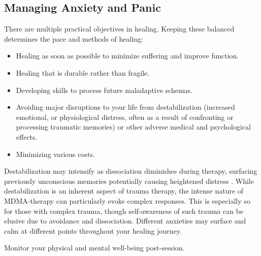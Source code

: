 \documentclass[12pt,letterpaper]{article}
\begin{document}
\subsection{Managing Anxiety and Panic}
\label{sectionManagement}
There are multiple practical objectives in healing. Keeping these balanced determines the pace and methods of healing:
\begin{itemize}
    \item Healing as soon as possible to minimize suffering and improve function.
    \item Healing that is durable rather than fragile.
    \item Developing skills to process future maladaptive schemas.
    \item Avoiding major disruptions to your life from destabilization (increased emotional, or physiological distress, often as a result of confronting or processing traumatic memories) or other adverse medical and psychological effects.
    \item Minimizing various costs.
\end{itemize}
Destabilization may intensify as dissociation diminishes during therapy, surfacing previously unconscious memories potentially causing heightened distress \cite{vanderKolkBody}. While destabilization is an inherent aspect of trauma therapy, the intense nature of MDMA-therapy can particularly evoke complex responses. This is especially so for those with complex trauma, though self-awareness of such trauma can be elusive due to avoidance and dissociation. Different anxieties may surface and calm at different points throughout your healing journey. 

Monitor your physical and mental well-being post-session.

\vspace{\baselineskip}
\end{document}

